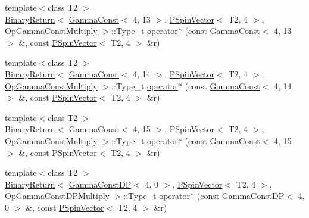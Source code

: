 \begin{DoxyCompactItemize}
\item 
{\footnotesize template$<$class T2 $>$ }\\\mbox{\hyperlink{structENSEM_1_1BinaryReturn}{Binary\+Return}}$<$ \mbox{\hyperlink{classENSEM_1_1GammaConst}{Gamma\+Const}}$<$ 4, 13 $>$, \mbox{\hyperlink{classENSEM_1_1PSpinVector}{P\+Spin\+Vector}}$<$ T2, 4 $>$, \mbox{\hyperlink{structENSEM_1_1OpGammaConstMultiply}{Op\+Gamma\+Const\+Multiply}} $>$\+::Type\+\_\+t \mbox{\hyperlink{group__primspinvector_ga7295695be69d983ea6fd8d3710a448d7}{operator$\ast$}} (const \mbox{\hyperlink{classENSEM_1_1GammaConst}{Gamma\+Const}}$<$ 4, 13 $>$ \&, const \mbox{\hyperlink{classENSEM_1_1PSpinVector}{P\+Spin\+Vector}}$<$ T2, 4 $>$ \&r)
\item 
{\footnotesize template$<$class T2 $>$ }\\\mbox{\hyperlink{structENSEM_1_1BinaryReturn}{Binary\+Return}}$<$ \mbox{\hyperlink{classENSEM_1_1GammaConst}{Gamma\+Const}}$<$ 4, 14 $>$, \mbox{\hyperlink{classENSEM_1_1PSpinVector}{P\+Spin\+Vector}}$<$ T2, 4 $>$, \mbox{\hyperlink{structENSEM_1_1OpGammaConstMultiply}{Op\+Gamma\+Const\+Multiply}} $>$\+::Type\+\_\+t \mbox{\hyperlink{group__primspinvector_ga890c8e465f4d1855cc9aa62f066b5679}{operator$\ast$}} (const \mbox{\hyperlink{classENSEM_1_1GammaConst}{Gamma\+Const}}$<$ 4, 14 $>$ \&, const \mbox{\hyperlink{classENSEM_1_1PSpinVector}{P\+Spin\+Vector}}$<$ T2, 4 $>$ \&r)
\item 
{\footnotesize template$<$class T2 $>$ }\\\mbox{\hyperlink{structENSEM_1_1BinaryReturn}{Binary\+Return}}$<$ \mbox{\hyperlink{classENSEM_1_1GammaConst}{Gamma\+Const}}$<$ 4, 15 $>$, \mbox{\hyperlink{classENSEM_1_1PSpinVector}{P\+Spin\+Vector}}$<$ T2, 4 $>$, \mbox{\hyperlink{structENSEM_1_1OpGammaConstMultiply}{Op\+Gamma\+Const\+Multiply}} $>$\+::Type\+\_\+t \mbox{\hyperlink{group__primspinvector_ga66707f89120c5b6f17816a485d9900eb}{operator$\ast$}} (const \mbox{\hyperlink{classENSEM_1_1GammaConst}{Gamma\+Const}}$<$ 4, 15 $>$ \&, const \mbox{\hyperlink{classENSEM_1_1PSpinVector}{P\+Spin\+Vector}}$<$ T2, 4 $>$ \&r)
\item 
{\footnotesize template$<$class T2 $>$ }\\\mbox{\hyperlink{structENSEM_1_1BinaryReturn}{Binary\+Return}}$<$ \mbox{\hyperlink{classENSEM_1_1GammaConstDP}{Gamma\+Const\+DP}}$<$ 4, 0 $>$, \mbox{\hyperlink{classENSEM_1_1PSpinVector}{P\+Spin\+Vector}}$<$ T2, 4 $>$, \mbox{\hyperlink{structENSEM_1_1OpGammaConstDPMultiply}{Op\+Gamma\+Const\+D\+P\+Multiply}} $>$\+::Type\+\_\+t \mbox{\hyperlink{group__primspinvector_ga90d081a5379c410e3a2225ba98128415}{operator$\ast$}} (const \mbox{\hyperlink{classENSEM_1_1GammaConstDP}{Gamma\+Const\+DP}}$<$ 4, 0 $>$ \&, const \mbox{\hyperlink{classENSEM_1_1PSpinVector}{P\+Spin\+Vector}}$<$ T2, 4 $>$ \&r)

\end{DoxyCompactItemize}

